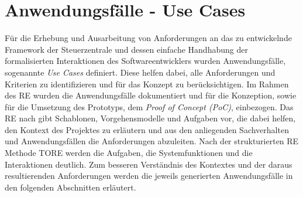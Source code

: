 \section{Anwendungsfälle - Use Cases}
\label{sec:usecases}
    Für die Erhebung und Ausarbeitung von Anforderungen an das zu entwickelnde Framework der Steuerzentrale und dessen 
    einfache Handhabung der formalisierten Interaktionen des Softwareentwicklers wurden Anwendungsfälle, sogenannte 
    \textit{Use Cases} definiert. Diese helfen dabei, alle Anforderungen und Kriterien zu identifizieren und für das 
    Konzept zu berücksichtigen. Im Rahmen des \acl{RE} wurden die Anwendungsfälle dokumentiert und für die Konzeption, sowie 
    für die Umsetzung des Prototyps, dem \textit{Proof of Concept (PoC)}, einbezogen. 
    Das \acs{RE} nach \cite{pohl2021basiswissen} gibt Schablonen, Vorgehensmodelle und Aufgaben 
    vor, die dabei helfen, den Kontext des Projektes zu erläutern und aus den anliegenden Sachverhalten und Anwendungsfällen 
    die Anforderungen abzuleiten. Nach der strukturierten \acs{RE} Methode \ac{TORE} \cite{tore2014} werden die 
    Aufgaben, die Systemfunktionen und die Interaktionen deutlich. Zum besseren Verständnis des Kontextes und der daraus 
    resultierenden Anforderungen werden die jeweils generierten Anwendungsfälle in den folgenden Abschnitten 
    erläutert.
    \\
    \linebreak
